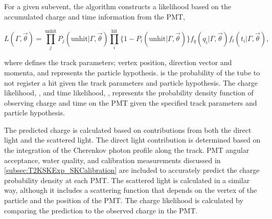 For a given subevent, the \fq algorithm constructs a likelihood based on the accumulated charge  and time information  from the  PMT,

\begin{equation}
  L(\Gamma, \vec{\theta}) = \prod^{\text{unhit}}_{j} P_{j}(\text{unhit}|\Gamma,\vec{\theta}) \prod^{\text{hit}}_{i} \{ 1 - P_{i}(\text{unhit}|\Gamma,\vec{\theta}) \}   f_{q}(q_{i} | \Gamma, \vec{\theta}) f_{t}(t_{i} | \Gamma, \vec{\theta}),
\end{equation}

where \quickmath{\vec{\theta}} defines the track parameters; vertex position, direction vector and momenta, and \quickmath{\Gamma} represents the particle hypothesis.  is the probability of the  tube to not register a hit given the track parameters and particle hypothesis. The charge likelihood, , and time likelihood, , represents the probability density function of observing charge  and time  on the  PMT given the specified track parameters and particle hypothesis.


The predicted charge is calculated based on contributions from both the direct light and the scattered light. The direct light contribution is determined based on the integration of the Cherenkov photon profile along the track. PMT angular acceptance, water quality, and calibration measurements discussed in \autoref{subsec:T2KSKExp_SKCalibration} are included to accurately predict the charge probability density at each PMT. The scattered light is calculated in a similar way, although it includes a scattering function that depends on the vertex of the particle and the position of the PMT. The charge likelihood is calculated by comparing the prediction to the observed charge in the PMT.

